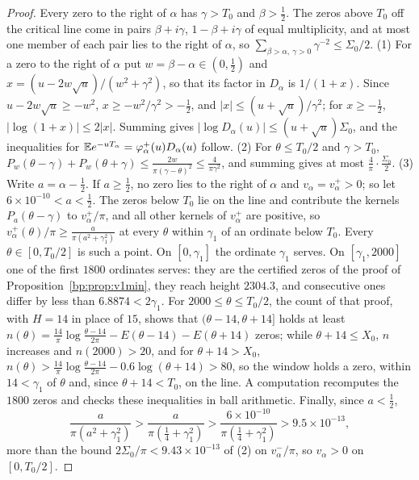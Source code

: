 \begin{proof}
Every zero to the right of $\alpha$ has $\gamma>T_0$ and $\beta>\frac12$. The zeros above $T_0$ off the critical line come in pairs $\beta+i\gamma$, $1-\beta+i\gamma$ of equal multiplicity, and at most one member of each pair lies to the right of $\alpha$, so $\sum_{\beta>\alpha,\ \gamma>0}\gamma^{-2}\le\Sigma_0/2$. (1) For a zero to the right of $\alpha$ put $w=\beta-\alpha\in(0,\frac12)$ and $x=(u-2w\sqrt u)/(w^2+\gamma^2)$, so that its factor in $D_\alpha$ is $1/(1+x)$. Since $u-2w\sqrt u\ge-w^2$, $x\ge-w^2/\gamma^2>-\frac12$, and $|x|\le(u+\sqrt u)/\gamma^2$; for $x\ge-\frac12$, $|\log(1+x)|\le2|x|$. Summing gives $|\log D_\alpha(u)|\le(u+\sqrt u)\Sigma_0$, and the inequalities for $\mathbb{E} e^{-uT_\alpha}=\varphi_\alpha^+(u)D_\alpha(u)$ follow. (2) For $\theta\le T_0/2$ and $\gamma>T_0$, $P_w(\theta-\gamma)+P_w(\theta+\gamma)\le\frac{2w}{\pi(\gamma-\theta)^2}\le\frac4{\pi\gamma^2}$, and summing gives at most $\frac4\pi\cdot\frac{\Sigma_0}2$. (3) Write $a=\alpha-\frac12$. If $a\ge\frac12$, no zero lies to the right of $\alpha$ and $v_\alpha=v_\alpha^+>0$; so let $6\times10^{-10}<a<\frac12$. The zeros below $T_0$ lie on the line and contribute the kernels $P_a(\theta-\gamma)$ to $v_\alpha^+/\pi$, and all other kernels of $v_\alpha^+$ are positive, so $v_\alpha^+(\theta)/\pi\ge\frac a{\pi(a^2+\gamma_1^2)}$ at every $\theta$ within $\gamma_1$ of an ordinate below $T_0$. Every $\theta\in[0,T_0/2]$ is such a point. On $[0,\gamma_1]$ the ordinate $\gamma_1$ serves. On $[\gamma_1,2000]$ one of the first $1800$ ordinates serves: they are the certified zeros of the proof of Proposition~\ref{bp:prop:v1min}, they reach height $2304.3$, and consecutive ones differ by less than $6.8874<2\gamma_1$. For $2000\le\theta\le T_0/2$, the count of that proof, with $H=14$ in place of $15$, shows that $(\theta-14,\theta+14]$ holds at least $n(\theta)=\frac{14}\pi\log\frac{\theta-14}{2\pi}-E(\theta-14)-E(\theta+14)$ zeros; while $\theta+14\le X_0$, $n$ increases and $n(2000)>20$, and for $\theta+14>X_0$, $n(\theta)>\frac{14}\pi\log\frac{\theta-14}{2\pi}-0.6\log(\theta+14)>80$, so the window holds a zero, within $14<\gamma_1$ of $\theta$ and, since $\theta+14<T_0$, on the line. A computation recomputes the $1800$ zeros and checks these inequalities in ball arithmetic. Finally, since $a<\frac12$,
\[
\frac a{\pi(a^2+\gamma_1^2)}>\frac a{\pi(\frac14+\gamma_1^2)}>\frac{6\times10^{-10}}{\pi(\frac14+\gamma_1^2)}>9.5\times10^{-13},
\]
more than the bound $2\Sigma_0/\pi<9.43\times10^{-13}$ of (2) on $v_\alpha^-/\pi$, so $v_\alpha>0$ on $[0,T_0/2]$.
\end{proof}

